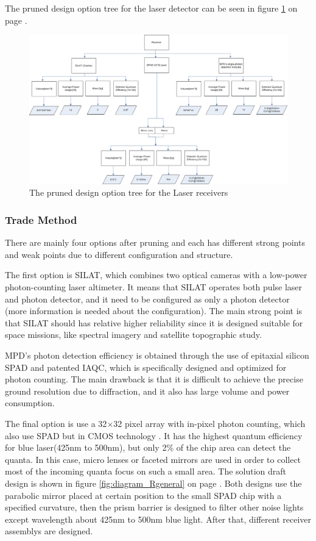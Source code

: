 The pruned design option tree for the laser detector can be seen in figure \ref{fig:PrunedReceiver} on page \pageref{fig:PrunedReceiver}.

\begin{figure}[ht!]
\centering
\includegraphics[scale=0.7, angle=90]{chapters/img/DOTreceiverPruned.jpg}
\caption{The pruned design option tree for the Laser receivers}
\label{fig:PrunedReceiver}
\end{figure}

\subsubsection{Trade Method}
\label{TOReceiverM}
There are mainly four options after pruning and each has different strong points and weak points due to different configuration and structure. 

The first option is \ac{SILAT}, which combines two optical cameras with a low-power photon-counting laser altimeter. It means that \acs{SILAT} operates both pulse laser and photon detector, and it need to be configured as only a photon detector (more information is needed about the configuration). The main strong point is that \acs{SILAT} should has relative higher reliability since it is designed suitable for space missions, like spectral imagery and satellite topographic study. 

\ac{MPD}'s photon detection efficiency is obtained through the use of epitaxial silicon \ac{SPAD} and patented \ac{IAQC}, which is specifically designed and optimized for photon counting. The main drawback is that it is difficult to achieve the precise ground resolution due to diffraction, and it also has large volume and power consumption.

The final option is use a 32$\times$32 pixel array with in-pixel photon counting, which also use \acs{SPAD} but in \ac{CMOS} technology \cite{SPAD}. It has the highest quantum efficiency for blue laser(425nm to 500nm), but only 2\% of the chip area can detect the quanta. In this case, micro lenses or faceted mirrors are used in order to collect most of the incoming quanta focus on such a small area. The solution draft design is shown in figure \ref{fig:diagram_Rgeneral} on page \pageref{fig:diagram_Rgeneral}. Both designs use the parabolic mirror placed at certain position to the small \acs{SPAD} chip with a specified curvature, then the prism barrier is designed to filter other noise lights except wavelength about 425nm to 500nm blue light. After that, different receiver assemblys are designed.

